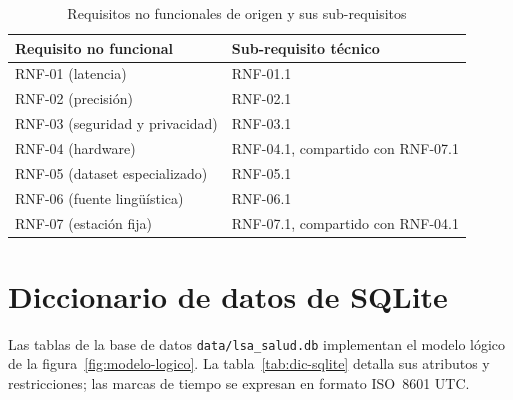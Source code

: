\begin{table}[H]
  \centering
  \caption{Requisitos no funcionales de origen y sus sub-requisitos}\label{tab:trazabilidad-rnf}
  \small
  \begin{tabularx}{\textwidth}{>{\raggedright\arraybackslash}p{5.2cm} X}
    \toprule
    \textbf{Requisito no funcional} & \textbf{Sub-requisito técnico} \\
    \midrule
    RNF-01 (latencia) & RNF-01.1 \\
    RNF-02 (precisión) & RNF-02.1 \\
    RNF-03 (seguridad y privacidad) & RNF-03.1 \\
    RNF-04 (hardware) & RNF-04.1, compartido con RNF-07.1 \\
    RNF-05 (dataset especializado) & RNF-05.1 \\
    RNF-06 (fuente lingüística) & RNF-06.1 \\
    RNF-07 (estación fija) & RNF-07.1, compartido con RNF-04.1 \\
    \bottomrule
  \end{tabularx}
\end{table}

\section{Diccionario de datos de SQLite}\label{anx:diccionario}

Las tablas de la base de datos \texttt{data/lsa\_salud.db} implementan el modelo lógico de la figura~\ref{fig:modelo-logico}. La tabla~\ref{tab:dic-sqlite} detalla sus atributos y restricciones; las marcas de tiempo se expresan en formato ISO~8601 UTC.

